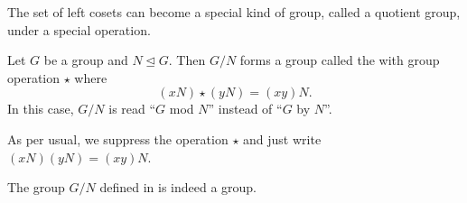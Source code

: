 The set of left cosets can become a special kind of group, called a quotient group, under a special operation.
\begin{definition}\label{definition-quotient-group}
    Let $G$ be a group and $N \unlhd G$. Then $G / N$ forms a group called the  with group operation $\star$ where
    \[
        (xN) \star (yN) = (xy)N.
    \]
    In this case, $G / N$ is read ``$G$ mod $N$'' instead of ``$G$ by $N$''.
\end{definition}
\begin{remark}
    As per usual, we suppress the operation $\star$ and just write $(xN)(yN) = (xy)N$.
\end{remark}

\begin{theorem}\label{thrm-quotient-group-requirement}
    The group $G/N$ defined in  is indeed a group.
\end{theorem}
